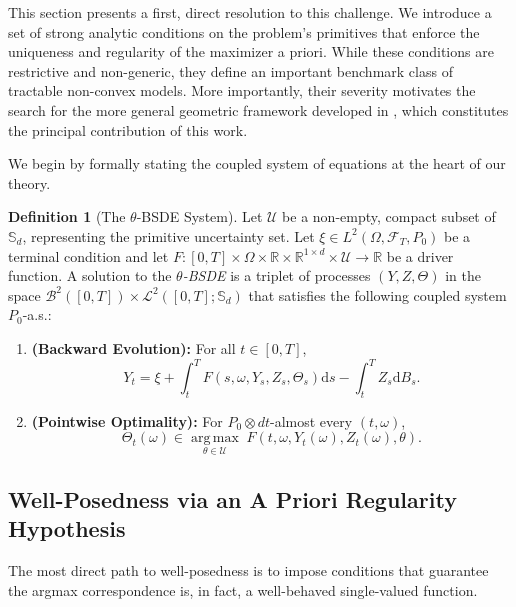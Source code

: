 \documentclass[12pt, letterpaper]{amsart}
\newcommand{\Ucal}{\mathcal{U}}
\newcommand{\Bcal}{\mathcal{B}}
\newcommand{\Lcalp}[1]{\mathcal{L}^{#1}}
\newcommand{\Sd}{\mathbb{S}_d}
\newcommand{\R}{\mathbb{R}}
\newcommand{\dd}{\mathrm{d}}
\DeclareMathOperator*{\argmax}{arg\,max}
\theoremstyle{plain}
\theoremstyle{definition}
\newtheorem{definition}[theorem]{Definition}
\theoremstyle{remark}
\numberwithin{equation}{section} %
\begin{document}
This section presents a first, direct resolution to this challenge. We introduce a set of strong analytic conditions on the problem's primitives that enforce the uniqueness and regularity of the maximizer a priori. While these conditions are restrictive and non-generic, they define an important benchmark class of tractable non-convex models. More importantly, their severity motivates the search for the more general geometric framework developed in , which constitutes the principal contribution of this work.

We begin by formally stating the coupled system of equations at the heart of our theory.

\begin{definition}[The $\theta$-BSDE System]
\label{def:theta_bsde_system}
Let $\Ucal$ be a non-empty, compact subset of $\Sd$, representing the primitive uncertainty set. Let $\xi \in L^2(\Omega, \mathcal{F}_T, P_0)$ be a terminal condition and let $F: [0,T] \times \Omega \times \R \times \R^{1\times d} \times \Ucal \to \R$ be a driver function. A solution to the \emph{$\theta$-BSDE} is a triplet of processes $(Y, Z, \Theta)$ in the space $\Bcal^2([0,T]) \times \Lcalp{2}([0,T]; \Sd)$ that satisfies the following coupled system $P_0$-a.s.:
\begin{enumerate}
    \item \textbf{(Backward Evolution):} For all $t \in [0,T]$,
    \begin{equation} \label{eq:theta_bsde_backward}
        Y_t = \xi + \int_t^T F(s, \omega, Y_s, Z_s, \Theta_s) \dd s - \int_t^T Z_s \dd B_s.
    \end{equation}
    \item \textbf{(Pointwise Optimality):} For $P_0 \otimes dt$-almost every $(t,\omega)$,
    \begin{equation} \label{eq:theta_bsde_optimality}
        \Theta_t(\omega) \in \underset{\theta \in \Ucal}{\argmax} \; F(t, \omega, Y_t(\omega), Z_t(\omega), \theta).
    \end{equation}
\end{enumerate}
\end{definition}

\subsection{Well-Posedness via an A Priori Regularity Hypothesis}

The most direct path to well-posedness is to impose conditions that guarantee the argmax correspondence is, in fact, a well-behaved single-valued function.
\end{document}
